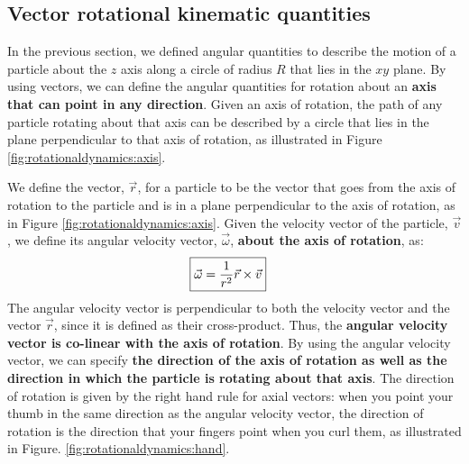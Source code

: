 \subsection{Vector rotational kinematic quantities}
In the previous section, we defined angular quantities to describe the motion of a particle about the $z$ axis along a circle of radius $R$ that lies in the $xy$ plane. By using vectors, we can define the angular quantities for rotation about an \textbf{axis that can point in any direction}. Given an axis of rotation, the path of any particle rotating about that axis can be described by a circle that lies in the plane perpendicular to that axis of rotation, as illustrated in Figure \ref{fig:rotationaldynamics:axis}.

We define the vector, $\vec r$, for a particle to be the vector that goes from the axis of rotation to the particle and is in a plane perpendicular to the axis of rotation, as in Figure \ref{fig:rotationaldynamics:axis}. Given the velocity vector of the particle, $\vec v$, we define its angular velocity vector, $\vec\omega$, \textbf{about the axis of rotation}, as:
\begin{align}
\Aboxed{\vec \omega = \frac{1}{r^2} \vec r \times \vec v}
\end{align}
The angular velocity vector is perpendicular to both the velocity vector and the vector $\vec r$, since it is defined as their cross-product. Thus, the \textbf{angular velocity vector is co-linear with the axis of rotation}. By using the angular velocity vector, we can specify \textbf{the direction of the axis of rotation as well as the direction in which the particle is rotating about that axis}. The direction of rotation is given by the right hand rule for axial vectors: when you point your thumb in the same direction as the angular velocity vector, the direction of rotation is the direction that your fingers point when you curl them, as illustrated in Figure. \ref{fig:rotationaldynamics:hand}.


